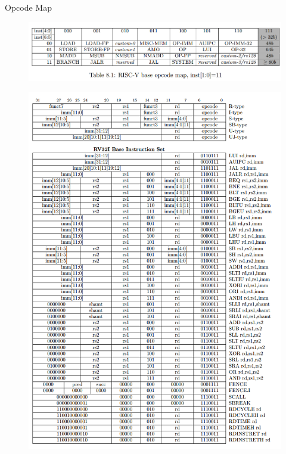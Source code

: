 \documentclass{myslide}
\begin{document}
\begin{frame}{Opcode Map}
\begin{figure}
\centering
\includegraphics[width=\linewidth]{fig/Lecture2/opcode_map.PNG}
\end{figure}
\end{frame}

\begin{frame}
\begin{figure}
\centering
\includegraphics[width=0.5\linewidth]{fig/Lecture2/base32.PNG}
\end{figure}
\end{frame}
\end{document}

